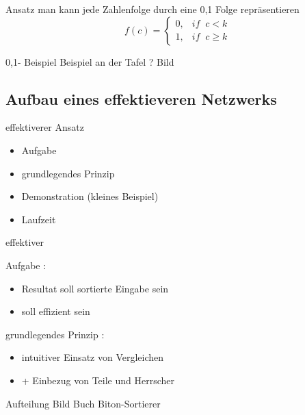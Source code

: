 \documentclass[ucs,9pt]{beamer}
\begin{document}
\begin{frame}{Ansatz}
    man kann jede Zahlenfolge durch eine 0,1 Folge repräsentieren
    $$
    f(c) = \begin{cases} 0 , & if \;\;c < k \\
    1 , & if \;\;c \geq k
    \end{cases}$$
\end{frame}

\begin{frame}{0,1- Beispiel}
    Beispiel an der Tafel ? Bild
\end{frame}

\subsection*{Aufbau eines effektieveren Netzwerks}
\begin{frame}{effektiverer Ansatz}
    \begin{itemize}
        \item Aufgabe
        \item grundlegendes Prinzip
        \item Demonstration (kleines Beispiel)
        \item Laufzeit
    \end{itemize}
\end{frame}

\begin{frame}{effektiver}
    \begin{semiverbatim}
         {Aufgabe :
            \begin{itemize}
                \item Resultat soll sortierte Eingabe sein
                \item \alert{soll effizient sein}
            \end{itemize}}
         {grundlegendes Prinzip :
            \begin{itemize}
                \item intuitiver Einsatz von Vergleichen
                \item[]\alert{+ Einbezug von Teile und Herrscher}
            \end{itemize}}
    \end{semiverbatim}
\end{frame}

\begin{frame}{Aufteilung}
    Bild Buch Biton-Sortierer
\end{frame}
\end{document}
